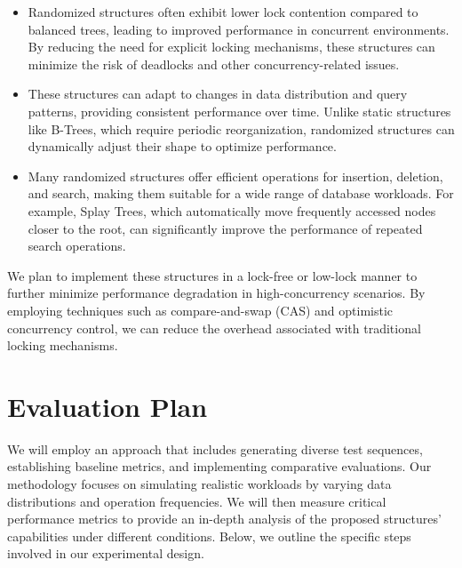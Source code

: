 \documentclass[sigconf]{acmart}
\begin{document}
\begin{itemize}
    \item Randomized structures often exhibit lower lock contention \cite{claudiu_2008_skip} compared to balanced trees, leading to improved performance in concurrent environments. By reducing the need for explicit locking mechanisms, these structures can minimize the risk of deadlocks and other concurrency-related issues. \cite{fraser_2007_concurrent}

    \item These structures can adapt to changes in data distribution and query patterns, providing consistent performance over time. Unlike static structures like B-Trees, which require periodic reorganization, randomized structures can dynamically adjust their shape to optimize performance.

    \item Many randomized structures offer efficient operations for insertion, deletion, and search, making them suitable for a wide range of database workloads. For example, Splay Trees, which automatically move frequently accessed nodes closer to the root, can significantly improve the performance of repeated search operations.
\end{itemize}
        
We plan to implement these structures in a lock-free or low-lock manner to further minimize performance degradation in high-concurrency scenarios. By employing techniques such as compare-and-swap (CAS) and optimistic concurrency control, we can reduce the overhead associated with traditional locking mechanisms.

\section{Evaluation Plan}

We will employ an approach that includes generating diverse test sequences, establishing baseline metrics, and implementing comparative evaluations. Our methodology focuses on simulating realistic workloads by varying data distributions and operation frequencies. We will then measure critical performance metrics to provide an in-depth analysis of the proposed structures' capabilities under different conditions. Below, we outline the specific steps involved in our experimental design.
\end{document}
